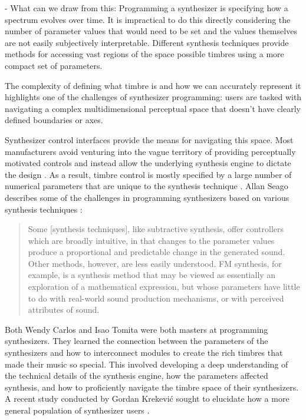 - What can we draw from this: Programming a synthesizer is specifying how a spectrum evolves over time. It is impractical to do this directly considering the number of parameter values that would need to be set and the values themselves are not easily subjectively interpretable. Different synthesis techniques provide methods for accessing vast regions of the space possible timbres using a more compact set of parameters. 

The complexity of defining what timbre is and how we can accurately represent it highlights one of the challenges of synthesizer programming: users are tasked with navigating a complex multidimensional perceptual space that doesn't have clearly defined boundaries or axes. 

Synthesizer control interfaces provide the means for navigating this space. Most manufacturers avoid venturing into the vague territory of providing perceptually motivated controls and instead allow the underlying synthesis engine to dictate the design \cite{seago2004critical}. As a result, timbre control is mostly specified by a large number of numerical parameters that are unique to the synthesis technique \cite{ethington1994seawave}. Allan Seago describes some of the challenges in programming synthesizers based on various synthesis techniques \cite{seago2013new}:

\begin{quote}
    Some [synthesis techniques], like subtractive synthesis, offer controllers which are broadly intuitive, in that changes to the parameter values produce a proportional and predictable change in the generated sound. Other methods, however, are less easily understood. FM synthesis, for example, is a synthesis method that may be viewed as essentially an exploration of a mathematical expression, but whose parameters have little to do with real-world sound production mechanisms, or with perceived attributes of sound.
\end{quote}

Both Wendy Carlos and Isao Tomita were both masters at programming synthesizers. They learned the connection between the parameters of the synthesizers and how to interconnect modules to create the rich timbres that made their music so special. This involved developing a deep understanding of the technical details of the synthesis engine, how the parameters affected synthesis, and how to proficiently navigate the timbre space of their synthesizers. A recent study conducted by Gordan Krekevi\'{c} sought to elucidate how a more general population of synthesizer users \cite{krekovic2019insights}. 

